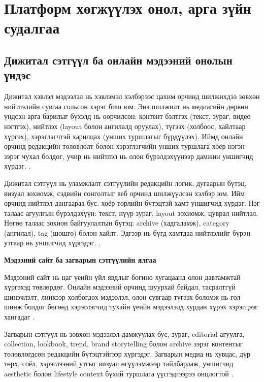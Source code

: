 
\chapter{Платформ хөгжүүлэх онол, арга зүйн судалгаа}
\label{Chapter1}

\section{Дижитал сэтгүүл ба онлайн мэдээний онолын үндэс}

Дижитал хэвлэл мэдээлэл нь хэвлэмэл хэлбэрээс цахим орчинд шилжихдээ зөвхөн нийтлэлийн сувгаа сольсон хэрэг биш юм. Энэ шилжилт нь медиагийн дөрвөн үндсэн арга барилыг бүхэлд нь өөрчилсөн: контент бэлтгэх (текст, зураг, видео нэгтгэх), нийтлэх (layout болон ангилалд оруулах), түгээх (холбоос, хайлтаар хүргэх), хэрэглэгчтэй харилцах (унших туршлагыг бүрдүүлэх). Иймд онлайн орчинд редакцийн төлөвлөлт болон хэрэглэгчийн унших туршлага хоёр нэгэн зэрэг чухал болдог, учир нь нийтлэл нь олон бүрэлдэхүүнээр дамжин уншигчид хүрдэг. \cite{kung_strategic_2017}.

Дижитал сэтгүүл нь уламжлалт сэтгүүлийн редакцийн логик, дугаарын бүтэц, визуал зохиомж, сэдвийн сонголтыг веб орчинд шилжүүлсэн хэлбэр юм. Ийм орчинд нийтлэл дангаараа бус, хоёр төрлийн бүтэцтэй хамт уншигчид хүрдэг. Нэг талаас агуулгын бүрэлдэхүүн: текст, нүүр зураг, layout зохиомж, цуврал нийтлэл. Нөгөө талаас зохион байгуулалтын бүтэц: archive (хадгаламж), category (ангилал), tag (шошго) болон хайлт. Эдгээр нь бүгд хамтдаа нийтлэлийг бүрэн утгаар нь уншигчид хүргэдэг. \cite{garrett_uxe_2011}.

\textbf{Мэдээний сайт ба загварын сэтгүүлийн ялгаа}

Мэдээний сайт нь цаг үеийн үйл явдлыг богино хугацаанд олон давтамжтай хүргэхэд төвлөрдөг. Онлайн мэдээний орчинд шуурхай байдал, тасралтгүй шинэчлэлт, линкээр холбогдох мэдээлэл, олон сувгаар түгээх боломж нь гол шинж болдог бөгөөд хэрэглэгчид тухайн үеийн мэдээлэлд хурдан хүрэх хэрэгцээг хангадаг \cite{deuze_2003_web_journalisms}.

Загварын сэтгүүл нь зөвхөн мэдээлэл дамжуулах бус, зураг, editorial агуулга, collection, lookbook, trend, brand storytelling болон archive зэрэг контентыг төлөвлөгдсөн редакцийн бүтэцтэйгээр хүргэдэг. Загварын медиа нь хувцас, дүр төрх, соёл, хэрэглээний утгыг визуал өгүүлэмжээр тайлбарлаж, уншигчид aesthetic болон lifestyle context бүхий туршлага үүсгэдгээрээ онцлогтой \cite{rocamora_2017_digital_fashion}.

